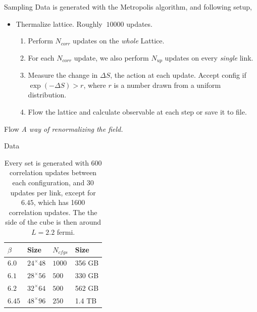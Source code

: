 \documentclass[10pt]{beamer}
\begin{document}
\begin{frame}{Sampling}
	Data is generated with the Metropolis algorithm, and following setup,
	\begin{itemize}
		\item Thermalize lattice. Roughly $~10000$ updates.
		\begin{enumerate}
			\item Perform $N_{corr}$ updates on the \textit{whole} Lattice.
			\item For each $N_{corr}$ update, we also perform $N_{up}$ updates on every \textit{single} link.
			\item Measure the change in $\Delta S$, the action at each update. Accept config if $\exp(-\Delta S) > r$, where $r$ is a number drawn from a uniform distribution.
			\item Flow the lattice and calculate observable at each step or save it to file.
		\end{enumerate}
	\end{itemize}
\end{frame}

\begin{frame}{Flow}
	\textit{A way of renormalizing the field.}
\end{frame}

\begin{frame}{Data}
	\begin{table}
		\caption{Every set is generated with 600 correlation updates between each configuration, and 30 updates per link, except for $6.45$, which has 1600 correlation updates. The the side of the cube is then around $L=2.2$ fermi.}
		\begin{tabular}{l | l | l | l}
			$\beta$ & Size & $N_{cfgs}$ & Size \\ \hline
			$6.0$ & $24^\times 48$ & $1000$ & 356 GB \\
			$6.1$ & $28^\times 56$ & $500$ & 330 GB\\
			$6.2$ & $32^\times 64$ & $500$ & 562 GB\\
			$6.45$ & $48^\times 96$ & $250$ & 1.4 TB\\
		\end{tabular}
		\label{tab:data_batches}
	\end{table}
\end{frame}
\end{document}
